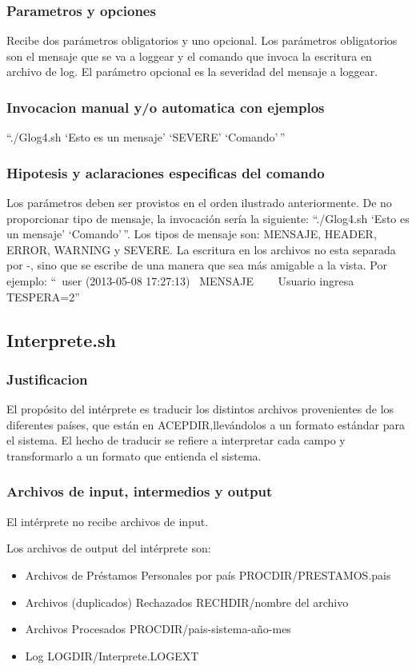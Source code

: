 \documentclass{article}
\begin{document}
		\subsubsection{Parametros y opciones}
		Recibe dos parámetros obligatorios y uno opcional. Los parámetros obligatorios son el mensaje que se va a loggear y el comando que invoca la escritura en archivo de log. El parámetro opcional es la severidad del mensaje a loggear.
		\subsubsection{Invocacion manual y/o automatica con ejemplos}
		``./Glog4.sh `Esto es un mensaje' `SEVERE' `Comando'\,''
		\subsubsection{Hipotesis y aclaraciones especificas del comando}
		Los parámetros deben ser provistos en el orden ilustrado anteriormente. De no proporcionar tipo de mensaje, la invocación sería la siguiente: ``./Glog4.sh `Esto es un mensaje' `Comando'\,''. Los tipos de mensaje son: MENSAJE, HEADER, ERROR, WARNING y SEVERE. La escritura en los archivos no esta separada por -, sino que se escribe de una manera que sea más amigable a la vista. Por ejemplo: ``~user (2013-05-08 17:27:13)~ MENSAJE ~~~ Usuario ingresa TESPERA=2''
	
	\subsection{Interprete.sh}
	
		\subsubsection{Justificacion}
		El propósito del intérprete es traducir los distintos archivos provenientes de los diferentes países, que están en ACEPDIR,llevándolos a un formato estándar para el sistema.
El hecho de traducir se refiere a interpretar cada campo y transformarlo a un formato que entienda el sistema.
		\subsubsection{Archivos de input, intermedios y output}
		El intérprete no recibe archivos de input.

		Los archivos de output del intérprete son:
			\begin{itemize}
				\item Archivos de Préstamos Personales por país PROCDIR/PRESTAMOS.pais
				\item Archivos (duplicados) Rechazados RECHDIR/nombre del archivo
				\item Archivos Procesados PROCDIR/pais-sistema-año-mes
				\item Log LOGDIR/Interprete.LOGEXT
			\end{itemize}			
\end{document}
